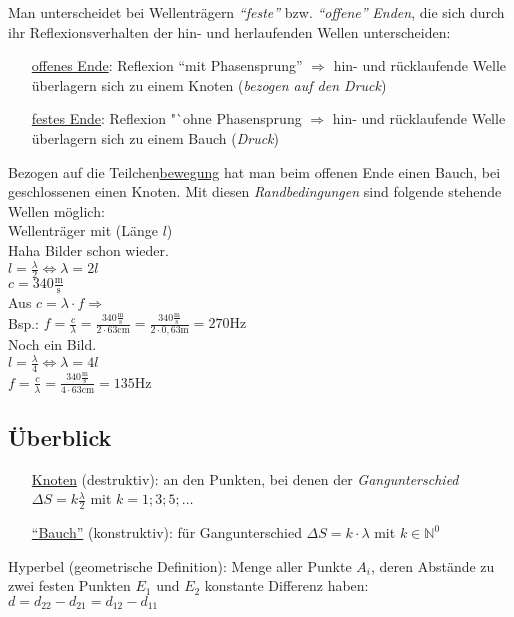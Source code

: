 \documentclass[a4paper]{scrartcl}
\begin{document}
Man unterscheidet bei Wellenträgern \emph{"`feste"'} bzw. \emph{"`offene"'}
\emph{Enden}, die sich durch ihr Reflexionsverhalten der hin- und herlaufenden
Wellen unterscheiden:
\begin{itemize}
	\item[\underline{offenes Ende}:]  Reflexion "`mit Phasensprung"'
		\(\Rightarrow\) hin- und rücklaufende Welle überlagern sich zu einem
		Knoten 	(\emph{bezogen auf den Druck})
	\item[\underline{festes Ende}:] Reflexion "`ohne Phasensprung
		\(\Rightarrow\) hin- und rücklaufende Welle überlagern sich zu einem
		Bauch (\emph{Druck})
\end{itemize}
Bezogen auf die Teilchen\underline{bewegung} hat man beim offenen Ende einen
Bauch, bei geschlossenen einen Knoten. Mit diesen \emph{Randbedingungen} sind
folgende stehende Wellen möglich:\\
Wellenträger mit (Länge \(l\))\\
Haha Bilder schon wieder.\\
\(l = \frac{\lambda}{2} \Leftrightarrow \lambda = 2l\)\\
\(c = 340 \frac{\mathrm{m}}{\mathrm{s}}\)\\
Aus \(c = \lambda \cdot f\Rightarrow\)\\
Bsp.: \(f = \frac{c}{\lambda} = \frac{340 \frac{\mathrm{m}}{\mathrm{s}}}{2
\cdot 63 \mathrm{cm}} = \frac{340 \frac{\mathrm{m}}{\mathrm{s}}}{2 \cdot 0,63
\mathrm{m}} = 270 \mathrm{Hz}\)\\
Noch ein Bild.\\
\(l = \frac{\lambda}{4} \Leftrightarrow \lambda = 4l\)\\
\(f = \frac{c}{\lambda} = \frac{340 \frac{\mathrm{m}}{\mathrm{s}}}{4 \cdot 63
\mathrm{cm}} = 135 \mathrm{Hz}\)

\subsection{Überblick}
\begin{itemize}
	\item[\underline{Knoten} (destruktiv):] an den Punkten, bei denen der
		\emph{Gangunterschied} \(\Delta S = k \frac{\lambda}{2}\) mit \(k=1; 3;
		5; \ldots\)
	\item[\underline{"`Bauch"'} (konstruktiv):] für Gangunterschied \(\Delta S
		=  k \cdot \lambda\) mit \(k \in \mathbb{N}^0\)
\end{itemize}
Hyperbel (geometrische Definition): Menge aller Punkte \(A_i\), deren Abstände
zu zwei festen Punkten \(E_1\) und \(E_2\) konstante Differenz haben:
\(d=d_{22} - d_{21} = d_{12} - d_{11}\)
\end{document}
